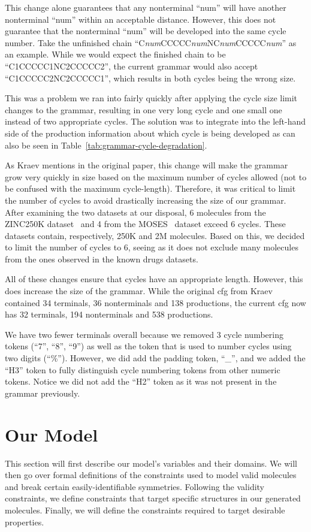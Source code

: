 \documentclass[../Document.tex]{subfiles}
\begin{document}
This change alone guarantees that any nonterminal ``num'' will have another nonterminal ``num'' within an acceptable distance.
However, this does not guarantee that the nonterminal ``num'' will be developed into the same cycle number.
Take the unfinished chain ``C\textit{num}CCCCC\textit{num}NC\textit{num}CCCCC\textit{num}'' as an example.
While we would expect the finished chain to be ``C1CCCCC1NC2CCCCC2'', the current grammar would also accept \\
``C1CCCCC2NC2CCCCC1'', which results in both cycles being the wrong size.

This was a problem we ran into fairly quickly after applying the cycle size limit changes to the grammar, resulting in one very long cycle and one small one instead of two appropriate cycles. The solution was to integrate into the left-hand side of the production information about which cycle is being developed as can also be seen in Table~\ref{tab:grammar-cycle-degradation}.

As Kraev mentions in the original paper\cite{kraev2018grammars}, this change will make the grammar grow very quickly in size based on the maximum number of cycles allowed (not to be confused with the maximum cycle-length).
Therefore, it was critical to limit the number of cycles to avoid drastically increasing the size of our grammar.
After examining the two datasets at our disposal, 6 molecules from the ZINC250K dataset~\cite{Akhmetshin2021} and 4 from the MOSES~\cite{MOSES} dataset exceed 6 cycles. These datasets contain, respectively, 250K and 2M molecules. Based on this, we decided to limit the number of cycles to 6, seeing as it does not exclude many molecules from the ones observed in the known drugs datasets.

All of these changes ensure that cycles have an appropriate length. However, this does increase the size of the grammar. While the original \gls{cfg} from Kraev contained 34 terminals, 36 nonterminals and 138 productions, the current \gls{cfg} now has 32 terminals, 194 nonterminals and 538 productions.

We have two fewer terminals overall because we removed 3 cycle numbering tokens (``7'', ``8'', ``9'') as well as the token that is used to number cycles using two digits (``\%''). However, we did add the padding token, ``\_'', and we added the ``H3'' token to fully distinguish cycle numbering tokens from other numeric tokens. Notice we did not add the ``H2'' token as it was not present in the grammar previously.


\section{Our Model}
This section will first describe our model's variables and their domains.
We will then go over formal definitions of the constraints used to model valid molecules and break certain easily-identifiable symmetries.
Following the validity constraints, we define constraints that target specific structures in our generated molecules.
Finally, we will define the constraints required to target desirable properties.
\end{document}
